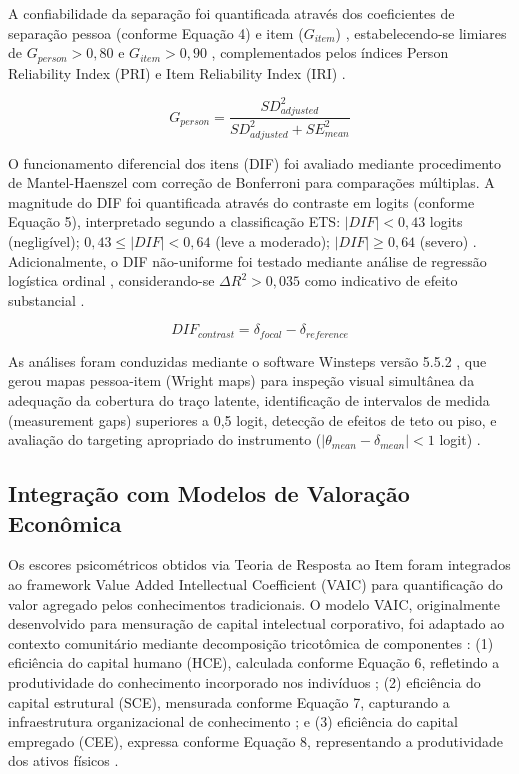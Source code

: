 A confiabilidade da separação foi quantificada através dos coeficientes de separação pessoa (conforme Equação 4) e item ($G_{item}$) \cite{Wright1996}, estabelecendo-se limiares de $G_{person} > 0,80$ e $G_{item} > 0,90$ \cite{Fisher2007}, complementados pelos índices Person Reliability Index (PRI) e Item Reliability Index (IRI) \cite{Bond2020}.

\begin{equation}
G_{person} = \frac{SD_{adjusted}^2}{SD_{adjusted}^2 + SE_{mean}^2}
\end{equation}

O funcionamento diferencial dos itens (DIF) foi avaliado mediante procedimento de Mantel-Haenszel \cite{Mantel1959} com correção de Bonferroni para comparações múltiplas. A magnitude do DIF foi quantificada através do contraste em logits (conforme Equação 5), interpretado segundo a classificação ETS: $|DIF| < 0,43$ logits (negligível); $0,43 \leq |DIF| < 0,64$ (leve a moderado); $|DIF| \geq 0,64$ (severo) \cite{Zieky1993}. Adicionalmente, o DIF não-uniforme foi testado mediante análise de regressão logística ordinal \cite{Swaminathan1990}, considerando-se $\Delta R^2 > 0,035$ como indicativo de efeito substancial \cite{Jodoin2003}.

\begin{equation}
DIF_{contrast} = \delta_{focal} - \delta_{reference}
\end{equation}

As análises foram conduzidas mediante o software Winsteps versão 5.5.2 \cite{Linacre2023}, que gerou mapas pessoa-item (Wright maps) \cite{Wilson2005} para inspeção visual simultânea da adequação da cobertura do traço latente, identificação de intervalos de medida (measurement gaps) superiores a 0,5 logit, detecção de efeitos de teto ou piso, e avaliação do targeting apropriado do instrumento ($|\theta_{mean} - \delta_{mean}| < 1$ logit) \cite{Bond2020}.

\subsection{Integração com Modelos de Valoração Econômica}

Os escores psicométricos obtidos via Teoria de Resposta ao Item foram integrados ao framework Value Added Intellectual Coefficient (VAIC) \cite{Pulic2000} para quantificação do valor agregado pelos conhecimentos tradicionais. O modelo VAIC, originalmente desenvolvido para mensuração de capital intelectual corporativo, foi adaptado ao contexto comunitário mediante decomposição tricotômica de componentes \cite{Bontis2000}: (1) eficiência do capital humano (HCE), calculada conforme Equação 6, refletindo a produtividade do conhecimento incorporado nos indivíduos \cite{Edvinsson1997}; (2) eficiência do capital estrutural (SCE), mensurada conforme Equação 7, capturando a infraestrutura organizacional de conhecimento \cite{Stewart1997}; e (3) eficiência do capital empregado (CEE), expressa conforme Equação 8, representando a produtividade dos ativos físicos \cite{Roos1997}.

